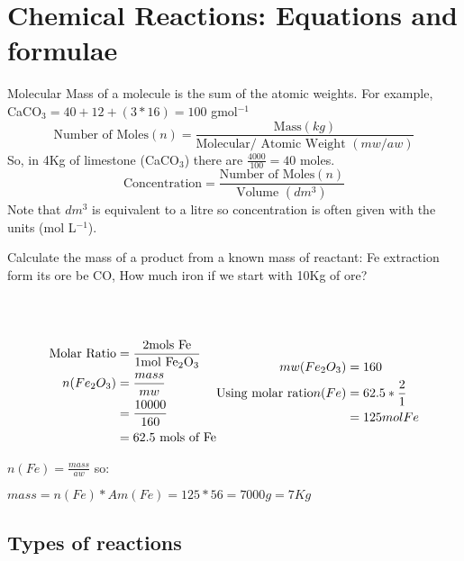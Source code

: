 \documentclass[a4paper, 12pt]{article}
\begin{document}
\newpage

\section{Chemical Reactions: Equations and formulae}
	Molecular Mass of a molecule is the sum of the atomic weights. For example, CaCO$_3 = 40 + 12 + (3 * 16) = 100$ gmol$^{-1}$ 
	\[ \text{Number of Moles}(n) = \frac{\text{Mass}(kg)}{\text{Molecular/ Atomic Weight }(mw/aw)} \] 
	So, in 4Kg of limestone (CaCO$_3$) there are $\frac{4000}{100} = 40$ moles. 
	\[ \text{Concentration} = \frac{\text{Number of Moles}(n)}{\text{Volume }(dm^3)} \]
	Note that $dm^3$ is equivalent to a litre so concentration is often given with the units (mol L$^{-1}$). \\
	\par
	Calculate the mass of a product from a known mass of reactant: Fe extraction form its ore be CO, How much iron if we start with 10Kg of ore?\\
	\par
	 \\
\\

		\begin{equation*}
		\begin{aligned}[c]
			\text{Molar Ratio} &= \frac{2 \text{mols Fe}}{1 \text{mol Fe$_2$O$_3$}} \\
			n(Fe_2O_3) &= \frac{mass}{mw} \\
			&= \frac{10000}{160} \\
			&= 62.5  \text{ mols of Fe}
		\end{aligned}
		\hfill
		\begin{aligned}[c]
			mw(Fe_2O_3) &= 160 \\
			\text{Using molar ratio} n(Fe) &= 62.5 * \frac{2}{1} \\
			&= 125 mol Fe \\
		\end{aligned}
		\end{equation*}

	$n(Fe) = \frac{mass}{aw}$ so:
	
	\begin{center}
	$mass = n(Fe) * Am(Fe) = 125* 56 = 7000g = 7Kg$
	\end{center}
	
	\subsection{Types of reactions}
\end{document}
